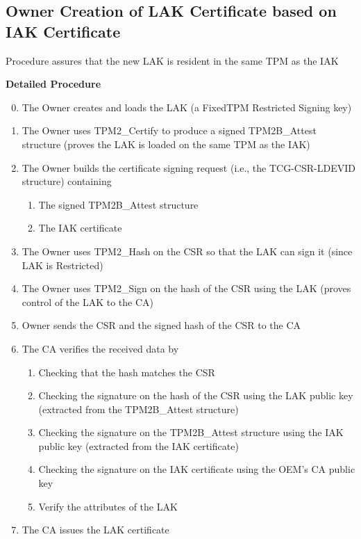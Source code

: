 \documentclass{article}
\begin{document}
\subsection*{Owner Creation of LAK Certificate based on IAK Certificate}

Procedure assures that the new LAK is resident in the same TPM as the IAK
\bigskip

\textbf{Detailed Procedure}
\begin{enumerate}
    \setcounter{enumi}{-1}
    \item The Owner creates and loads the LAK (a FixedTPM Restricted Signing key)
    \item The Owner uses TPM2\_Certify to produce a signed TPM2B\_Attest structure (proves the LAK is loaded on the same TPM as the IAK)
    \item The Owner builds the certificate signing request (i.e., the TCG-CSR-LDEVID structure) containing
    \begin{enumerate}
        \item The signed TPM2B\_Attest structure
        \item The IAK certificate
    \end{enumerate}
    \item The Owner uses TPM2\_Hash on the CSR so that the LAK can sign it (since LAK is Restricted)
    \item The Owner uses TPM2\_Sign on the hash of the CSR using the LAK (proves control of the LAK to the CA)
    \item Owner sends the CSR and the signed hash of the CSR to the CA
    \item The CA verifies the received data by
    \begin{enumerate}
        \item Checking that the hash matches the CSR
        \item Checking the signature on the hash of the CSR using the LAK public key (extracted from the TPM2B\_Attest structure)
        \item Checking the signature on the TPM2B\_Attest structure using the IAK public key (extracted from the IAK certificate)
        \item Checking the signature on the IAK certificate using the OEM's CA public key
        \item Verify the attributes of the LAK
    \end{enumerate}
    \item The CA issues the LAK certificate
\end{enumerate}
\bigskip
\end{document}
